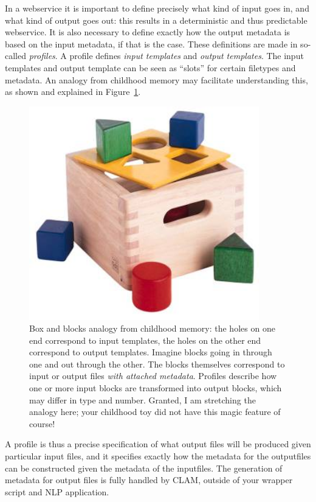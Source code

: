 \documentclass[a4paper,12pt,twoside,openright]{report}
\begin{document}
In a webservice it is important to define precisely what kind of input goes in,
and what kind of output goes out: this results in a deterministic and thus
predictable webservice. It is also necessary to define exactly how the output
metadata is based on the input metadata, if that is the case. These definitions
are made in so-called \emph{profiles}. A profile defines \emph{input templates}
and \emph{output templates}. The input templates and output template can be
seen as ``slots'' for certain filetypes and metadata. An analogy from childhood
memory may facilitate understanding this, as shown and explained in
Figure~\ref{fig:blokkendoos}.

\begin{figure}[h]
\begin{center}
\includegraphics[width=100.0mm]{blokkendoos.jpg}
\caption{Box and blocks analogy from childhood memory: the holes on one end
correspond to input templates, the holes on the other end correspond to output
templates. Imagine blocks going in through one and out through the other. The
blocks themselves correspond to input or output files \emph{with attached
metadata}. Profiles describe how one or more input blocks are transformed into
output blocks, which may differ in type and number. Granted, I am stretching the
analogy here; your childhood toy did not have this magic feature of course!}
\label{fig:blokkendoos} 
\end{center}
\end{figure}

A profile is thus a precise specification of what output files will be produced
given particular input files, and it specifies exactly how the metadata for the
outputfiles can be constructed given the metadata of the inputfiles. The
generation of metadata for output files is fully handled by CLAM, outside of
your wrapper script and NLP application.
\end{document}
